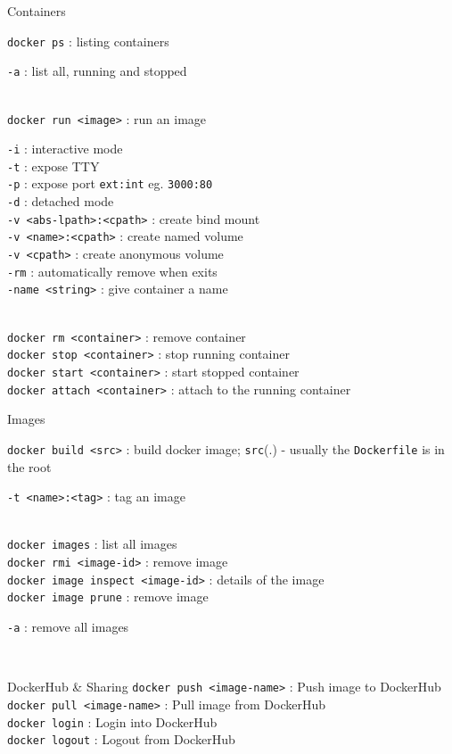 \documentclass[10pt]{article}
\newcommand{\code}[1]{{\color{teal}\texttt{#1}}}
\newcommand{\cmd}[3][.3]{\code{#2} : #3 \\[#1em]}
\newcommand{\opts}[2][.5]{\hspace*{.5cm}\begin{minipage}{0.9\textwidth}
  #2
  \vspace*{-1em}
\end{minipage}\\[#1em]}
\newcommand{\cluster}[2]{\begin{mybox}{#1}
  #2
  \vspace*{-1.3em}
\end{mybox}}
\begin{document}
\begin{multicols*}{2}

  \cluster{Containers}{
    \cmd{docker ps}{listing containers}
    \opts{
      \code{-a} : list all, running and stopped \\
    }
    \cmd{docker run <image>}{run an image}
    \opts{
      \code{-i} : interactive mode \\
      \code{-t} : expose TTY \\
      \code{-p} : expose port \code{ext:int} eg. \code{3000:80} \\
      \code{-d} : detached mode \\
      \code{-v <abs-lpath>:<cpath>} : create bind mount \\
      \code{-v <name>:<cpath>} : create named volume \\
      \code{-v <cpath>} : create anonymous volume \\
      \code{-rm} : automatically remove when exits \\
      \code{-name <string>} : give container a name \\
    }
    \code{docker rm <container>} : remove container \\[.3em]
    \code{docker stop <container>} : stop running container \\[.3em]
    \code{docker start <container>} : start stopped container \\[.3em]
    \code{docker attach <container>} : attach to the running container \\[.3em]
  }

  \cluster{Images}{
    \cmd{docker build <src>}{build docker image; \code{src}(.) - usually the \code{Dockerfile} is in the root}
    \opts{
      \code{-t <name>:<tag>} : tag an image \\
    }
    \code{docker images} : list all images \\[.3em]
    \code{docker rmi <image-id>} : remove image \\[.3em]
    \code{docker image inspect <image-id>} : details of the image\\[.3em]
    \code{docker image prune} : remove image \\[.3em]
    \opts{
      \code{-a} : remove all images \\
    }
  }

  \begin{mybox}{DockerHub \& Sharing}
    \cmd{docker push <image-name>}{Push image to DockerHub}
    \cmd{docker pull <image-name>}{Pull image from DockerHub}
    \cmd{docker login}{Login into DockerHub}
    \cmd{docker logout}{Logout from DockerHub}
    \vspace*{-1.3em}
  \end{mybox}


\end{multicols*}
\end{document}
